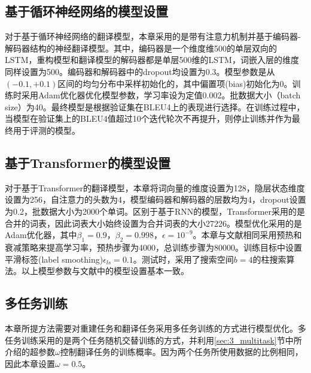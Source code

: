\subsection{基于循环神经网络的模型设置}
\label{sec:3_rnn_setup}
对于基于循环神经网络的翻译模型，本章采用的是带有注意力机制并基于编码器-解码器结构的神经翻译模型\cite{4_luong-etal-2015-effective}。其中，编码器是一个维度维500的单层双向的LSTM，重构模型和翻译模型的解码器都是单层500维的LSTM，词嵌入层的维度同样设置为500。编码器和解码器中的dropout均设置为0.3。模型参数是从$(-0.1,+0.1)$区间的均匀分布中采样初始化的，其中偏置项(bias)初始化为0。训练时采用Adam\cite{34_DBLP:journals/corr/KingmaB14}优化器优化模型参数，学习率设为定值0.002。批数据大小（batch size）为40。最终模型是根据验证集在BLEU4\cite{42_papineni-etal-2002-bleu}上的表现进行选择。在训练过程中，当模型在验证集上的BLEU4值超过10个迭代轮次不再提升，则停止训练并作为最终用于评测的模型。

\subsection{基于Transformer的模型设置}
\label{sec:3_transformer_setup}
对于基于Transformer\cite{5_DBLP:journals/corr/VaswaniSPUJGKP17}的翻译模型，本章将词向量的维度设置为128，隐层状态维度设置为256，自注意力的头数为4，模型编码器和解码器的层数均为4，dropout设置为0.2，批数据大小为2000个单词。区别于基于RNN的模型，Transformer采用的是合并的词表，因此词表大小始终设置为合并词表的大小27226。模型优化采用的是Adam优化器，其中$\beta_1=0.9$，$\beta_2=0.998$，$\epsilon=10^{-9}$。本章与文献\cite{5_DBLP:journals/corr/VaswaniSPUJGKP17}相同采用预热和衰减策略来提高学习率，预热步骤为4000，总训练步骤为80000。训练目标中设置平滑标签(label smoothing)$\epsilon_{ls}=0.1$。测试时，采用了搜索空间$b=4$的柱搜索算法。以上模型参数与文献\cite{33_yin-etal-2020-novel}中的模型设置基本一致。

\subsection{多任务训练}
本章所提方法需要对重建任务和翻译任务采用多任务训练的方式进行模型优化。多任务训练采用的是两个任务随机交替训练的方式，并利用\ref{sec:3_multitask}节中所介绍的超参数$\omega$控制翻译任务的训练概率。因为两个任务所使用数据的比例相同，因此本章设置$\omega=0.5$。

